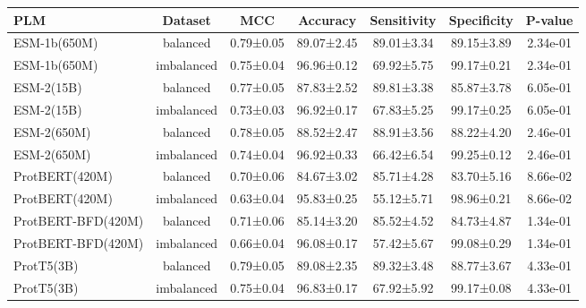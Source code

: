 \begin{tabular}{lcccccc}
\toprule
               PLM &    Dataset &       MCC &   Accuracy & Sensitivity & Specificity &  P-value \\
\midrule
      ESM-1b(650M) &   balanced & 0.79±0.05 & 89.07±2.45 &  89.01±3.34 &  89.15±3.89 & 2.34e-01 \\
      ESM-1b(650M) & imbalanced & 0.75±0.04 & 96.96±0.12 &  69.92±5.75 &  99.17±0.21 & 2.34e-01 \\
        ESM-2(15B) &   balanced & 0.77±0.05 & 87.83±2.52 &  89.81±3.38 &  85.87±3.78 & 6.05e-01 \\
        ESM-2(15B) & imbalanced & 0.73±0.03 & 96.92±0.17 &  67.83±5.25 &  99.17±0.25 & 6.05e-01 \\
       ESM-2(650M) &   balanced & 0.78±0.05 & 88.52±2.47 &  88.91±3.56 &  88.22±4.20 & 2.46e-01 \\
       ESM-2(650M) & imbalanced & 0.74±0.04 & 96.92±0.33 &  66.42±6.54 &  99.25±0.12 & 2.46e-01 \\
    ProtBERT(420M) &   balanced & 0.70±0.06 & 84.67±3.02 &  85.71±4.28 &  83.70±5.16 & 8.66e-02 \\
    ProtBERT(420M) & imbalanced & 0.63±0.04 & 95.83±0.25 &  55.12±5.71 &  98.96±0.21 & 8.66e-02 \\
ProtBERT-BFD(420M) &   balanced & 0.71±0.06 & 85.14±3.20 &  85.52±4.52 &  84.73±4.87 & 1.34e-01 \\
ProtBERT-BFD(420M) & imbalanced & 0.66±0.04 & 96.08±0.17 &  57.42±5.67 &  99.08±0.29 & 1.34e-01 \\
        ProtT5(3B) &   balanced & 0.79±0.05 & 89.08±2.35 &  89.32±3.48 &  88.77±3.67 & 4.33e-01 \\
        ProtT5(3B) & imbalanced & 0.75±0.04 & 96.83±0.17 &  67.92±5.92 &  99.17±0.08 & 4.33e-01 \\
\bottomrule
\end{tabular}
